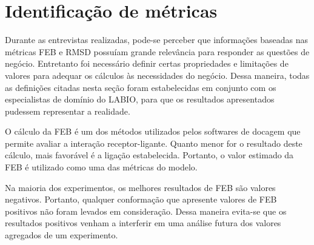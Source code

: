 \begin{table}[h]
\caption{Questões de negócio identificadas pelos especialistas com maior relevância para análise de experimentos de docagem}
\label{tab:questaoNegocio}
\centering
{}
\end{table}

\section{Identificação de métricas}
\label{sec:IdentificacaoDeMetricas}

Durante as entrevistas realizadas, pode-se perceber que informações baseadas nas métricas FEB e RMSD possuíam grande relevância para responder as questões de negócio. Entretanto foi necessário definir certas propriedades e limitações de valores para adequar os cálculos às necessidades do negócio. Dessa maneira, todas as definições citadas nesta seção foram estabelecidas em conjunto com os especialistas de domínio do LABIO, para que os resultados apresentados pudessem representar a realidade.

O cálculo da FEB é um dos métodos utilizados pelos softwares de docagem que permite avaliar a interação receptor-ligante. Quanto menor for o resultado deste cálculo, mais favorável é a ligação estabelecida. Portanto, o valor estimado da FEB é utilizado como uma das métricas do modelo.

Na maioria dos experimentos, os melhores resultados de FEB são valores negativos. Portanto, qualquer conformação que apresente valores de FEB positivos não foram levados em consideração. Dessa maneira evita-se que os resultados positivos venham a interferir em uma análise futura dos valores agregados de um experimento. 

